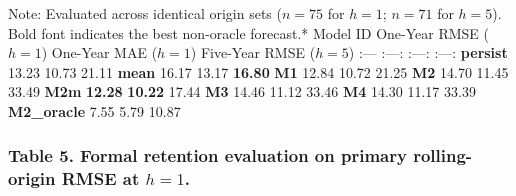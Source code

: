 \documentclass[11pt]{article}
\begin{document}
Note: Evaluated across identical origin sets (\(n=75\) for \(h=1\);
\(n=71\) for \(h=5\)). Bold font indicates the best non-oracle
forecast.* \textbar{} Model ID \textbar{} One-Year RMSE (\(h=1\))
\textbar{} One-Year MAE (\(h=1\)) \textbar{} Five-Year RMSE (\(h=5\))
\textbar{} \textbar{} :--- \textbar{} :---: \textbar{} :---: \textbar{}
:---: \textbar{} \textbar{} \textbf{persist} \textbar{} 13.23 \textbar{}
10.73 \textbar{} 21.11 \textbar{} \textbar{} \textbf{mean} \textbar{}
16.17 \textbar{} 13.17 \textbar{} \textbf{16.80} \textbar{} \textbar{}
\textbf{M1} \textbar{} 12.84 \textbar{} 10.72 \textbar{} 21.25
\textbar{} \textbar{} \textbf{M2} \textbar{} 14.70 \textbar{} 11.45
\textbar{} 33.49 \textbar{} \textbar{} \textbf{M2m} \textbar{}
\textbf{12.28} \textbar{} \textbf{10.22} \textbar{} 17.44 \textbar{}
\textbar{} \textbf{M3} \textbar{} 14.46 \textbar{} 11.12 \textbar{}
33.46 \textbar{} \textbar{} \textbf{M4} \textbar{} 14.30 \textbar{}
11.17 \textbar{} 33.39 \textbar{} \textbar{} \textbf{M2\_oracle}
\textbar{} 7.55 \textbar{} 5.79 \textbar{} 10.87 \textbar{}

\subsubsection{\texorpdfstring{Table 5. Formal retention evaluation on
primary rolling-origin RMSE at
\(h=1\).}{Table 5. Formal retention evaluation on primary rolling-origin RMSE at h=1.}}\label{table-5.-formal-retention-evaluation-on-primary-rolling-origin-rmse-at-h1.}
\end{document}
